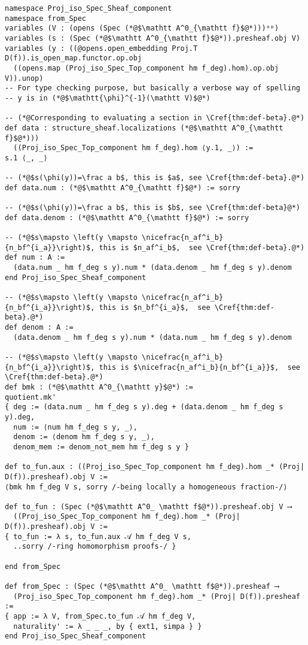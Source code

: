 \documentclass[a4paper,UKenglish,cleveref, autoref, thm-restate]{lipics-v2021}
\begin{document}
\begin{lstlisting}
namespace Proj_iso_Spec_Sheaf_component
namespace from_Spec
variables (V : (opens (Spec (*@$\mathtt A^0_{\mathtt f}$@*)))ᵒᵖ)
variables (s : (Spec (*@$\mathtt A^0_{\mathtt f}$@*)).presheaf.obj V)
variables (y : ((@opens.open_embedding Proj.T D(f)).is_open_map.functor.op.obj
  ((opens.map (Proj_iso_Spec_Top_component hm f_deg).hom).op.obj V)).unop)
-- For type checking purpose, but basically a verbose way of spelling 
-- y is in (*@$\mathtt{\phi}^{-1}(\mathtt V)$@*)

-- (*@Corresponding to evaluating a section in \Cref{thm:def-beta}.@*)
def data : structure_sheaf.localizations (*@$\mathtt A^0_{\mathtt f}$@*)))
  ((Proj_iso_Spec_Top_component hm f_deg).hom ⟨y.1, _⟩) :=
s.1 ⟨_, _⟩

-- (*@$s(\phi(y))=\frac a b$, this is $a$, see \Cref{thm:def-beta}.@*)
def data.num : (*@$\mathtt A^0_{\mathtt f}$@*) := sorry

-- (*@$s(\phi(y))=\frac a b$, this is $b$, see \Cref{thm:def-beta}@*)
def data.denom : (*@$\mathtt A^0_{\mathtt f}$@*) := sorry

-- (*@$s\mapsto \left(y \mapsto \nicefrac{n_af^i_b}{n_bf^{i_a}}\right)$, this is $n_af^i_b$,  see \Cref{thm:def-beta}.@*)
def num : A :=
  (data.num _ hm f_deg s y).num * (data.denom _ hm f_deg s y).denom
end Proj_iso_Spec_Sheaf_component

-- (*@$s\mapsto \left(y \mapsto \nicefrac{n_af^i_b}{n_bf^{i_a}}\right)$, this is $n_bf^{i_a}$,  see \Cref{thm:def-beta}.@*)
def denom : A :=
  (data.denom _ hm f_deg s y).num * (data.num _ hm f_deg s y).denom

-- (*@$s\mapsto \left(y \mapsto \nicefrac{n_af^i_b}{n_bf^{i_a}}\right)$, this is $\nicefrac{n_af^i_b}{n_bf^{i_a}}$,  see \Cref{thm:def-beta}.@*)
def bmk : (*@$\mathtt A^0_{\mathtt y}$@*) :=
quotient.mk'
{ deg := (data.num _ hm f_deg s y).deg + (data.denom _ hm f_deg s y).deg,
  num := ⟨num hm f_deg s y, _⟩,
  denom := ⟨denom hm f_deg s y, _⟩,
  denom_mem := denom_not_mem hm f_deg s y }

def to_fun.aux : ((Proj_iso_Spec_Top_component hm f_deg).hom _* (Proj| D(f)).presheaf).obj V :=
⟨bmk hm f_deg V s, sorry /-being locally a homogeneous fraction-/⟩

def to_fun : (Spec (*@$\mathtt A^0_ \mathtt f$@*)).presheaf.obj V ⟶
  ((Proj_iso_Spec_Top_component hm f_deg).hom _* (Proj| D(f)).presheaf).obj V :=
{ to_fun := λ s, to_fun.aux 𝒜 hm f_deg V s, 
  ..sorry /-ring homomorphism proofs-/ }

end from_Spec

def from_Spec : (Spec (*@$\mathtt A^0_ \mathtt f$@*)).presheaf ⟶
  (Proj_iso_Spec_Top_component hm f_deg).hom _* (Proj| D(f)).presheaf :=
{ app := λ V, from_Spec.to_fun 𝒜 hm f_deg V,
  naturality' := λ _ _ _, by { ext1, simpa } }
end Proj_iso_Spec_Sheaf_component
\end{lstlisting}
\end{document}
